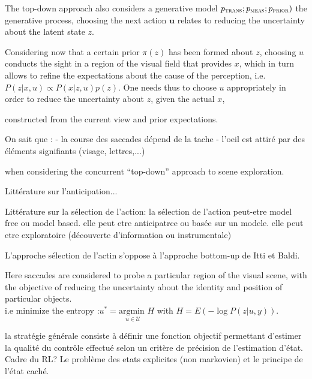 \documentclass[12pt,twoside,openright]{article}
\begin{document}
{The top-down approach also considers a generative model $p_\text{\sc trans}; p_\text{\sc meas};p_\text{\sc prior})$ the generative process, choosing the next action $\boldsymbol{u}$ relates to reducing the uncertainty about the latent state $z$.




Considering now that a certain prior $\pi(z)$ has been formed about $z$, choosing  $u$ conducts the sight in a region of the visual field that provides $x$, which in turn allows to refine the expectations about the cause of the perception, i.e.
$ P(z|x,u) \propto P(x|z,u) p(z)$. 
One needs thus to choose $u$ appropriately in order to reduce the uncertainty about $z$, given the actual $x$,

constructed from the current view and prior expectations. 

On sait que :
- la course des saccades dépend de la tache
- l'oeil est attiré par des éléments signifiants (visage, lettres,...)

when considering the concurrent ``top-down'' approach to scene exploration. 
 }


{\color{magenta}Littérature sur l'anticipation... 
}


{\color{magenta}Littérature sur la sélection de l'action: la sélection de l'action peut-etre model free ou model based. elle peut etre anticipatrce ou basée sur un modele. elle peut etre exploratoire (découverte d'information ou instrumentale)
	
L'approche sélection de l'actin s'oppose à l'approche bottom-up de Itti et Baldi. 
}


{\color{blue} Here saccades are considered to probe a particular region of the visual scene, with the objective of reducing the uncertainty about the identity and position of particular objects. %
}
	\\
{\color{blue}  {\color{magenta} i.e minimize the entropy :$u^* = \underset{u \in \mathcal{U}}{\text{argmin }} H$ with $H = E(-\log P(z|u,y))$.}
}
	




{\color{magenta} la stratégie générale consiste à définir une fonction objectif permettant d'estimer la qualité du contrôle effectué selon un critère de précision de l'estimation d'état. Cadre du RL? Le problème des etats explicites (non markovien) et le principe de l'état caché.}
\end{document}

